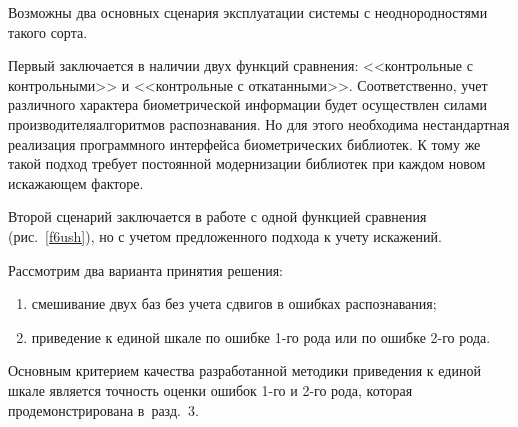 \begin{multicols}{2}

     Возможны два основных сценария эксплуатации системы с неоднородностями 
такого сорта.

 Первый заключается в наличии двух функций сравнения: <<контрольные 
с контрольными>> и <<контрольные с откатанными>>. Соответственно, учет\linebreak 
различного характера биометрической информации будет осуществлен силами 
производителя\linebreak алгоритмов распознавания. Но для этого необходима нестандартная 
реализация программного интерфейса биометрических библиотек. К тому же такой 
подход требует постоянной модернизации библиотек при каждом новом искажающем 
факторе. 

Второй сценарий заключается в работе с одной функцией сравнения 
(рис.~\ref{f6ush}), но с учетом предложенного подхода к учету искажений.

     
     Рассмотрим два варианта принятия решения: 
     \begin{enumerate}[(1)]
     \item смешивание двух баз без учета сдвигов в ошибках распознавания;
\item приведение к единой шкале по ошибке 1-го рода или по ошибке 2-го рода.
\end{enumerate}

     Основным критерием качества разработанной методики приведения к единой 
шкале является точность оценки ошибок 1-го и 2-го рода, которая продемонстрирована 
в~разд.~3. 
     
 


\end{multicols}
